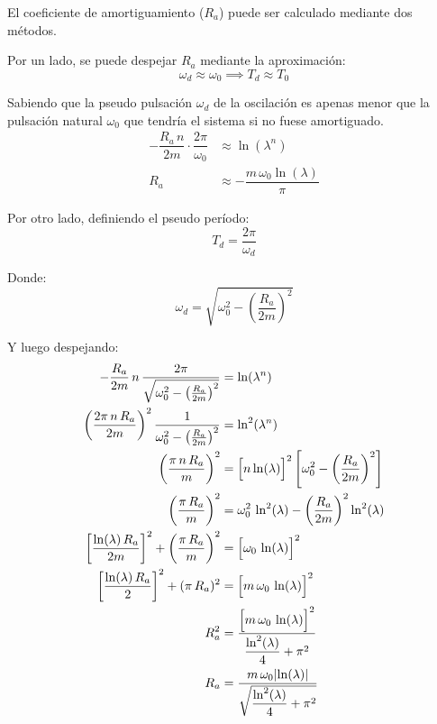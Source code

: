 \documentclass[a5paper,12pt,twoside]{book}
\begin{document}
El coeficiente de amortiguamiento ($R_a$) puede ser calculado mediante dos métodos.

Por un lado, se puede despejar $R_a$ mediante la aproximación:
\begin{equation*}
    \omega_d \approx \omega_0 \implies T_d \approx T_0
\end{equation*}

Sabiendo que la pseudo pulsación $\omega_d$ de la oscilación es apenas menor que la pulsación natural $\omega_0$ que tendría el sistema si no fuese amortiguado.
\begin{align*}
    -\dfrac{R_a \, n}{2m} \cdot \dfrac{2 \pi}{\omega_0} &\approx \ln (\lambda^n)
    \\
    R_a &\approx -\dfrac{m \, \omega_0 \ln (\lambda)}{\pi}
\end{align*}

Por otro lado, definiendo el pseudo período:
\begin{equation*}
    T_d=\frac{2\pi}{\omega_d}
\end{equation*}

Donde:
\begin{equation*}
    \omega_d=\sqrt{\omega_0^2-\left(\frac{R_a}{2m}\right)^2}
\end{equation*}

Y luego despejando:
\begin{align*}
    -\dfrac{R_a}{2m} \, n \, \dfrac{2 \pi}{\sqrt{\omega_0^2-\left(\frac{R_a}{2m}\right)^2}} &= \ln (\lambda^n)
    \\
    \left( \frac{2 \pi \, n \, R_a}{2m} \right)^2 \frac{1}{\omega_0^2-\left(\frac{R_a}{2m}\right)^2} &= \ln^2 (\lambda^n)
    \\
    \left( \frac{\pi \, n \, R_a}{m} \right)^2 &= \Big[ n \ln(\lambda) \Big]^2 \left[ \omega_0^2 - \left( \frac{R_a}{2m} \right)^2 \right]
    \\
    \left( \frac{\pi \, R_a}{m} \right)^2 &= \omega_0^2 \, \ln^2 (\lambda) - \left( \frac{R_a}{2m} \right)^2 \ln^2 (\lambda)
    \\
    \left[ \frac{\ln (\lambda) \, R_a}{2m} \right]^2 + \left( \frac{\pi \, R_a}{m} \right)^2 &= \Big[ \omega_0 \, \ln (\lambda) \Big]^2
    \\
    \left[ \frac{\ln (\lambda) \, R_a}{2} \right]^2 + (\pi \, R_a)^2 &= \Big[ m \, \omega_0 \, \ln (\lambda) \Big]^2
    \\
    R_a^2 &= \frac{\Big[ m \, \omega_0 \, \ln (\lambda) \Big]^2}{\dfrac{\ln^2(\lambda)}{4}+\pi^2}
    \\
    R_a &= \frac{m \, \omega_0 {\left| {\ln (\lambda)} \right|}}{\sqrt{\dfrac{\ln^2(\lambda)}{4}+\pi^2}}
\end{align*}
\end{document}
